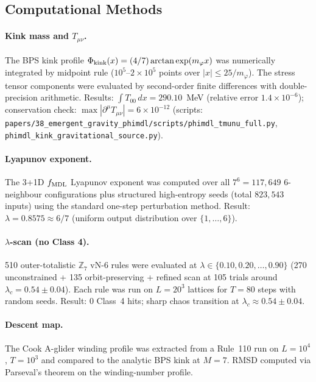 \documentclass[11pt]{article}
\theoremstyle{remark}
\newcommand{\ZS}{\mathbb{Z}_7}
\begin{document}
\begin{appendices}
\section{Computational Methods}
\label{app:comp}

\paragraph{Kink mass and $T_{\mu\nu}$.}
The BPS kink profile $\Phi_{\rm kink}(x) = (4/7)\arctan\exp(m_\varphi x)$
was numerically integrated by midpoint rule ($10^5$--$2\times10^5$ points over
$|x| \leq 25/m_\varphi$).  The stress tensor components were evaluated by
second-order finite differences with double-precision arithmetic.
Results: $\int T_{00}\,dx = 290.10$~MeV (relative error $1.4\times10^{-6}$);
conservation check: $\max|\partial^\mu T_{\mu\nu}| = 6\times10^{-12}$
(scripts: \texttt{papers/38\_emergent\_gravity\_phimdl/scripts/phimdl\_tmunu\_full.py},
\texttt{phimdl\_kink\_gravitational\_source.py}).

\paragraph{Lyapunov exponent.}
The 3+1D $f_{\rm MDL}$ Lyapunov exponent was computed over all $7^6 = 117{,}649$
6-neighbour configurations plus structured high-entropy seeds (total
$823{,}543$ inputs) using the standard one-step perturbation method.
Result: $\lambda = 0.8575 \approx 6/7$ (uniform output distribution over
$\{1,\ldots,6\}$).

\paragraph{$\lambda$-scan (no Class 4).}
510 outer-totalistic $\ZS$ vN-6 rules were evaluated at $\lambda\in
\{0.10,0.20,\ldots,0.90\}$ (270 unconstrained + 135 orbit-preserving +
refined scan at 105 trials around $\lambda_c = 0.54\pm0.04$).
Each rule was run on $L=20^3$ lattices for $T=80$ steps with random seeds.
Result: 0 Class~4 hits; sharp chaos transition at $\lambda_c\approx0.54\pm0.04$.

\paragraph{Descent map.}
The Cook A-glider winding profile was extracted from a Rule~110 run on
$L=10^4$, $T=10^3$ and compared to the analytic BPS kink at $M=7$.
RMSD computed via Parseval's theorem on the winding-number profile.


\end{appendices}
\end{document}
